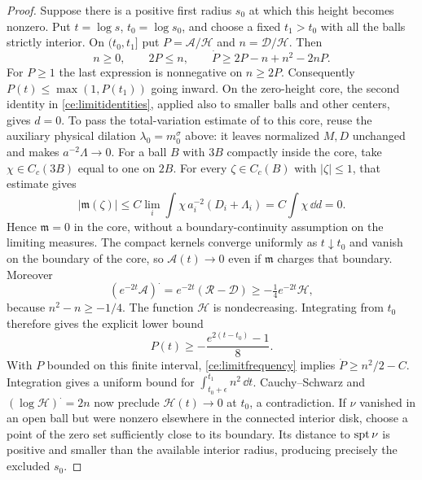 \begin{proof}
Suppose there is a positive first radius $s_0$ at which this height
becomes nonzero.  Put $t=\log s$, $t_0=\log s_0$, and choose a fixed
$t_1>t_0$ with all the balls strictly interior.  On $(t_0,t_1]$ put
$P=\mathcal A/\mathcal H$ and $n=\mathcal D/\mathcal H$.  Then
\begin{equation}
 \label{ce:limitfrequency}
 n\ge0,\qquad 2P\le n,\qquad
 \dot P\ge 2P-n+n^2-2nP.
\end{equation}
For $P\ge1$ the last expression is nonnegative on $n\ge2P$.
Consequently $P(t)\le\max(1,P(t_1))$ going inward.
On the zero-height core, the second identity in
\eqref{ce:limitidentities}, applied also to smaller balls and other
centers, gives $d=0$.  To pass the total-variation estimate of
 to this core, reuse the auxiliary physical dilation
$\lambda_0=m_0^\sigma$ above: it leaves normalized $M,D$ unchanged
and makes $a^{-2}\Lambda\to0$.  For a ball $B$ with $3B$ compactly
inside the core, take $\chi\in C_c(3B)$ equal to one on $2B$.
For every $\zeta\in C_c(B)$ with $|\zeta|\le1$, that estimate gives
\[
 |\mathfrak m(\zeta)|
 \le C\lim_i\int\chi\,a_i^{-2}(D_i+\Lambda_i)
 =C\int\chi\,\dd d=0.
\]
Hence $\mathfrak m=0$ in the core, without a boundary-continuity
assumption on the limiting measures.  The compact kernels converge
uniformly as $t\downarrow t_0$ and vanish on the boundary of the
core, so $\mathcal A(t)\to0$ even if $\mathfrak m$ charges that
boundary.  Moreover
\[
 (e^{-2t}\mathcal A)^{\displaystyle\cdot}
 =e^{-2t}(\mathcal R-\mathcal D)
 \ge-\tfrac14e^{-2t}\mathcal H,
\]
because $n^2-n\ge-1/4$.  The function $\mathcal H$ is nondecreasing.
Integrating from $t_0$ therefore gives the explicit lower bound
\[
 P(t)\ge-\frac{e^{2(t-t_0)}-1}{8}.
\]
With $P$ bounded on this finite interval,
\eqref{ce:limitfrequency} implies $\dot P\ge n^2/2-C$.
Integration gives a uniform bound for
$\int_{t_0+\epsilon}^{t_1}n^2\,\dd t$.  Cauchy--Schwarz and
$(\log\mathcal H)^{\displaystyle\cdot}=2n$ now preclude
$\mathcal H(t)\to0$ at $t_0$, a contradiction.  If $\nu$ vanished
in an open ball but were nonzero elsewhere in the connected interior
disk, choose a point of the zero set sufficiently close to its boundary.
Its distance to $\operatorname{spt}\nu$ is positive and smaller than the available
interior radius, producing precisely the excluded $s_0$.


\end{proof}
